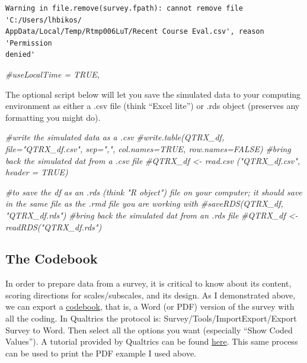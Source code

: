 \documentclass[
  english,
]{book}
\newenvironment{Shaded}{\begin{snugshade}}{\end{snugshade}}
\newcommand{\CommentTok}[1]{\textcolor[rgb]{0.56,0.35,0.01}{\textit{#1}}}
\begin{document}
\begin{verbatim}
Warning in file.remove(survey.fpath): cannot remove file 'C:/Users/lhbikos/
AppData/Local/Temp/Rtmp006LuT/Recent Course Eval.csv', reason 'Permission
denied'
\end{verbatim}

\begin{Shaded}
\begin{Highlighting}[]
\CommentTok{#useLocalTime = TRUE,}
\end{Highlighting}
\end{Shaded}

The optional script below will let you save the simulated data to your computing environment as either a .csv file (think ``Excel lite'') or .rds object (preserves any formatting you might do).

\begin{Shaded}
\begin{Highlighting}[]
\CommentTok{#write the simulated data  as a .csv}
\CommentTok{#write.table(QTRX_df, file="QTRX_df.csv", sep=",", col.names=TRUE, row.names=FALSE)}
\CommentTok{#bring back the simulated dat from a .csv file}
\CommentTok{#QTRX_df <- read.csv ("QTRX_df.csv", header = TRUE)}
\end{Highlighting}
\end{Shaded}

\begin{Shaded}
\begin{Highlighting}[]
\CommentTok{#to save the df as an .rds (think "R object") file on your computer; it should save in the same file as the .rmd file you are working with}
\CommentTok{#saveRDS(QTRX_df, "QTRX_df.rds")}
\CommentTok{#bring back the simulated dat from an .rds file}
\CommentTok{#QTRX_df <- readRDS("QTRX_df.rds")}
\end{Highlighting}
\end{Shaded}

\hypertarget{the-codebook}{%
\subsection{The Codebook}\label{the-codebook}}

In order to prepare data from a survey, it is critical to know about its content, scoring directions for scales/subscales, and its design. As I demonstrated above, we can export a \href{./Rate-a-Course_Codebook.pdf}{codebook}, that is, a Word (or PDF) version of the survey with all the coding. In Qualtrics the protocol is: Survey/Tools/ImportExport/Export Survey to Word. Then select all the options you want (especially ``Show Coded Values''). A tutorial provided by Qualtrics can be found \href{https://www.qualtrics.com/support/survey-platform/survey-module/survey-tools/import-and-export-surveys/}{here}. This same process can be used to print the PDF example I used above.
\end{document}
